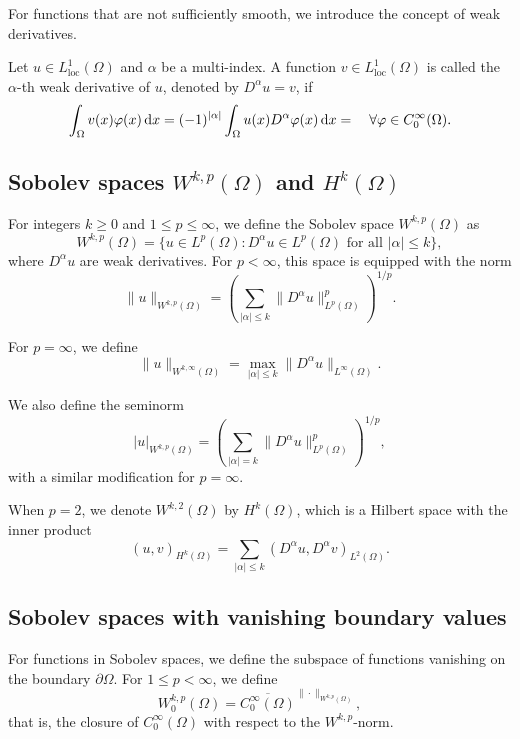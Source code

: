 For functions that are not sufficiently smooth, we introduce the concept of weak derivatives.

\begin{definition}
Let $u \in L^1_{\text{loc}}(\Omega)$ and $\alpha$ be a multi-index. A function $v \in L^1_{\text{loc}}(\Omega)$ is called the $\alpha$-th weak derivative of $u$, denoted by $D^\alpha u = v$, if
\[
  \int_\Omega v(x) \varphi(x) \mathop{}\!\mathrm{d} x =  (-1)^{|\alpha|} \int_\Omega u(x) D^\alpha \varphi(x) \mathop{}\!\mathrm{d} x = \quad \forall \varphi \in C_0^\infty(\Omega).
\]
\end{definition}

\subsection{Sobolev spaces $W^{k,p}(\Omega)$ and $H^k(\Omega)$}

For integers $k \geq 0$ and $1 \leq p \leq \infty$, we define the Sobolev space $W^{k,p}(\Omega)$ as
\[
W^{k,p}(\Omega) = \{u \in L^p(\Omega) : D^\alpha u \in L^p(\Omega) \text{ for all } |\alpha| \leq k\},
\]
where $D^\alpha u$ are weak derivatives. For $p < \infty$, this space is equipped with the norm
\[
\|u\|_{W^{k,p}(\Omega)} = \left( \sum_{|\alpha| \leq k} \|D^\alpha u\|_{L^p(\Omega)}^p \right)^{1/p}.
\]

For $p = \infty$, we define
\[
\|u\|_{W^{k,\infty}(\Omega)} = \max_{|\alpha| \leq k} \|D^\alpha u\|_{L^\infty(\Omega)}.
\]

We also define the seminorm
\[
|u|_{W^{k,p}(\Omega)} = \left( \sum_{|\alpha| = k} \|D^\alpha u\|_{L^p(\Omega)}^p \right)^{1/p},
\]
with a similar modification for $p = \infty$.

When $p = 2$, we denote $W^{k,2}(\Omega)$ by $H^k(\Omega)$, which is a Hilbert space with the inner product
\[
(u, v)_{H^k(\Omega)} = \sum_{|\alpha| \leq k} (D^\alpha u, D^\alpha v)_{L^2(\Omega)}.
\]

\subsection{Sobolev spaces with vanishing boundary values}

For functions in Sobolev spaces, we define the subspace of functions vanishing on the boundary $\partial\Omega$. For $1 \leq p < \infty$, we define
\[
W_0^{k,p}(\Omega) = \overline{C_0^\infty(\Omega)}^{\|\cdot\|_{W^{k,p}(\Omega)}},
\]
that is, the closure of $C_0^\infty(\Omega)$ with respect to the $W^{k,p}$-norm.

